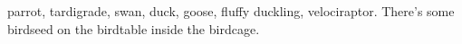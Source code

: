 \documentclass{article}
\begin{document}
\Gls{parrot}, \gls{tardigrade}, \gls{swan}, \gls{duck}, \gls{goose},
\gls{fluffy} \gls{duckling}, \gls{velociraptor}.
There's some \gls{birdseed} on the \gls{birdtable} inside the 
\gls{birdcage}.

\printunsrtglossaries
\end{document}

